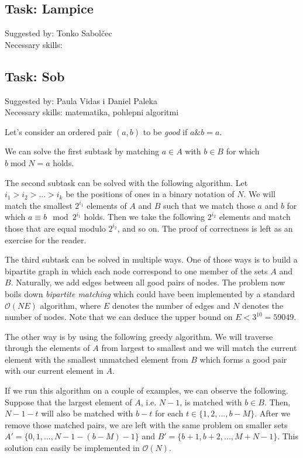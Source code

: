 \documentclass[a4paper]{article}
\begin{document}
\subsection*{Task: Lampice}
\textsf{Suggested by: Tonko Sabolčec}\\
\textsf{Necessary skills: }

\subsection*{Task: Sob}
\textsf{Suggested by: Paula Vidas i Daniel Paleka}\\
\textsf{Necessary skills: matematika, pohlepni algoritmi}

Let's consider an ordered pair $(a, b)$ to be \emph{good} if $a \mathbin\& b = a$.

We can solve the first subtask by matching $a \in A$ with $b \in B$ for which
$b \mathbin{\textrm{mod}} N = a$ holds.

The second subtask can be solved with the following algorithm. Let
$i_1 > i_2 > ... > i_k$ be the positions of ones in a binary notation
of $N$. We will match the smallest $2^{i_1}$ elements of $A$ and $B$ such that
we match those $a$ and $b$ for which $a \equiv b \mod 2^{i_1}$ holds. Then we
take the following $2^{i_2}$ elements and match those that are equal modulo
$2^{i_2}$, and so on. The proof of correctness is left as an exercise for the
reader.

The third subtask can be solved in multiple ways. One of those ways is to
build a bipartite graph in which each node correspond to one member of the
sets $A$ and $B$. Naturally, we add edges between all good pairs of nodes. The
problem now boils down \emph{bipartite matching} which could have been
implemented by a standard $\mathcal{O}(NE)$ algorithm, where $E$ denotes the
number of edges and $N$ denotes the number of nodes. Note that we can deduce
the upper bound on $E < 3^{10} = 59049$.

The other way is by using the following greedy algorithm. We will traverse
through the elements of $A$ from largest to smallest and we will match the
current element with the smallest unmatched element from $B$ which forms a
good pair with our current element in $A$.

If we run this algorithm on a couple of examples, we can observe the following.
Suppose that the largest element of $A$, i.e. $N - 1$, is matched with $b \in B$.
Then, $N - 1 - t$ will also be matched with $b - t$ for each
$t \in \{1, 2, ..., b - M\}$. After we remove those matched pairs, we are left
with the same problem on smaller sets $A' = \{0, 1, ..., N - 1 - (b - M) - 1\}$
and $B' = \{b + 1, b + 2, ..., M + N - 1\}$. This solution can easily be
implemented in $\mathcal{O}(N)$.
\end{document}
